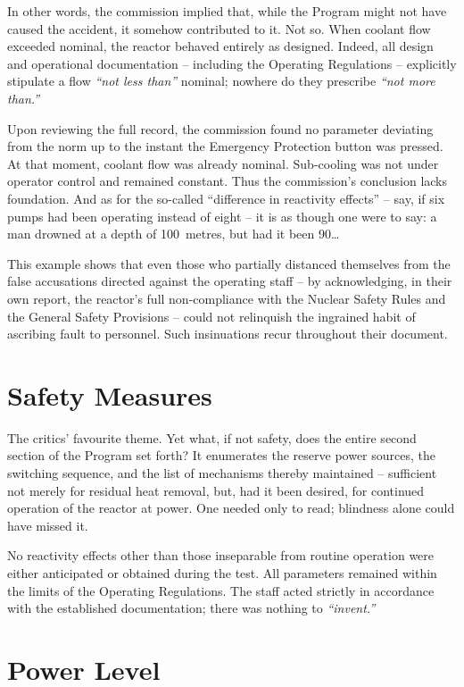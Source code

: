 \documentclass[openright]{bookest}
\begin{document}
In other words, the commission implied that, while the Program might not have caused the accident, it somehow contributed to it. Not so. When coolant flow exceeded nominal, the reactor behaved entirely as designed. Indeed, all design and operational documentation -- including the Operating Regulations -- explicitly stipulate a flow \textit{``not less than''} nominal; nowhere do they prescribe \textit{``not more than.''}

Upon reviewing the full record, the commission found no parameter deviating from the norm up to the instant the Emergency Protection button was pressed. At that moment, coolant flow was already nominal. Sub-cooling was not under operator control and remained constant. Thus the commission's conclusion lacks foundation. And as for the so-called ``difference in reactivity effects'' -- say, if six pumps had been operating instead of eight -- it is as though one were to say: a man drowned at a depth of \num{100}~metres, but had it been \num{90}\ldots

This example shows that even those who partially distanced themselves from the false accusations directed against the operating staff -- by acknowledging, in their own report, the reactor's full non-compliance with the Nuclear Safety Rules and the General Safety Provisions -- could not relinquish the ingrained habit of ascribing fault to personnel. Such insinuations recur throughout their document.

\section{Safety Measures}

The critics' favourite theme. Yet what, if not safety, does the entire second section of the Program set forth? It enumerates the reserve power sources, the switching sequence, and the list of mechanisms thereby maintained -- sufficient not merely for residual heat removal, but, had it been desired, for continued operation of the reactor at power. One needed only to read; blindness alone could have missed it.

No reactivity effects other than those inseparable from routine operation were either anticipated or obtained during the test. All parameters remained within the limits of the Operating Regulations. The staff acted strictly in accordance with the established documentation; there was nothing to \textit{``invent.''}

\section{Power Level}
\end{document}
